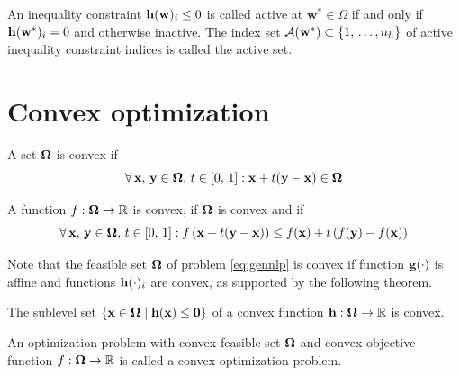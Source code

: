 \begin{definition}
An inequality constraint $\mathbf{h}(\mathbf{w})_i \leq 0$ is called active at $\mathbf{w}^* \in \Omega$ if and only if $\mathbf{h}(\mathbf{w}^*)_i = 0$ and otherwise inactive. The index set $\mathcal{A}(\mathbf{w}^*) \subset \{1,\,\ldots,n_h\}$ of active inequality constraint indices is called the active set.
\end{definition}

\section{Convex optimization}
\label{section:convexopt}

\begin{definition}
A set $\feasibleSet$ is convex if 
\begin{equation}
\forall \, \mathbf{x},\,\mathbf{y} \in \feasibleSet,\, t \in \left[0,\,1\right]: \mathbf{x} + t(\mathbf{y} - \mathbf{x}) \in \feasibleSet
\label{eq:convexSet}
\end{equation}
\end{definition}

\begin{definition}
A function $f:\feasibleSet \to \mathbb{R}$ is convex, if $\feasibleSet$ is convex and if 
\begin{equation}
\forall \, \mathbf{x},\, \mathbf{y} \in \feasibleSet,\, t \in \left[0,\,1\right]: f\left( \mathbf{x} + t(\mathbf{y} - \mathbf{x}) \right) \leq f(\mathbf{x}) + t \left( f(\mathbf{y}) - f(\mathbf{x}) \right)
\end{equation}
\end{definition}

Note that the feasible set $\feasibleSet$ of problem \ref{eq:gennlp} is convex if function $\mathbf{g}(\cdot)$ is affine and functions $\mathbf{h}(\cdot)_i$ are convex, as supported by the following theorem.

\begin{theorem}
The sublevel set $\{\mathbf{x} \in \feasibleSet \mid \ineqCon{\mathbf{x}} \leq \mathbf{0}\}$ of a convex function $\mathbf{h}:\feasibleSet \to \mathbb{R}$ is convex.
\end{theorem}

\begin{definition}
An optimization problem with convex feasible set $\feasibleSet$ and convex objective function $f:\feasibleSet \to \mathbb{R}$ is called a convex optimization problem.
\label{def:convexoptproble}
\end{definition}

